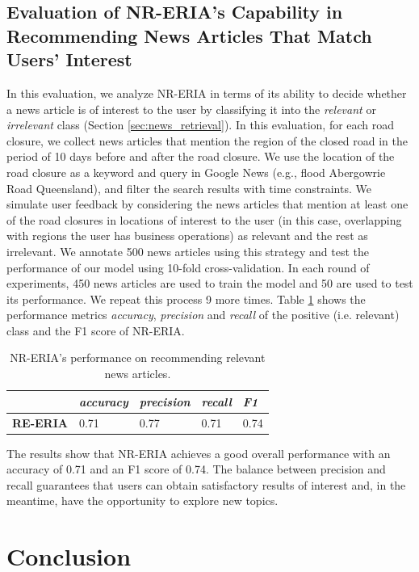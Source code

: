 \documentclass[
]{ceurart}
\begin{document}
\subsection{Evaluation of NR-ERIA's Capability in Recommending News Articles That Match Users' Interest}
In this evaluation, we analyze NR-ERIA in terms of its ability to decide whether a news article is of interest to the user by classifying it into the \textit{relevant} or \textit{irrelevant} class (Section \ref{sec:news_retrieval}). In this evaluation, for each road closure, we collect news articles that mention the region of the closed road in the period of 10 days before and after the road closure. We use the location of the road closure as a keyword and query in Google News (e.g., flood Abergowrie Road Queensland), and filter the search results with time constraints. We simulate user feedback by considering the news articles that mention at least one of the road closures in locations of interest to the user (in this case, overlapping with regions the user has business operations) as relevant and the rest as irrelevant. We annotate 500 news articles using this strategy and test the performance of our model using 10-fold cross-validation. In each round of experiments, 450 news articles are used to train the model and 50 are used to test its performance. We repeat this process 9 more times. Table \ref{tab:RL-ERIA e3} shows the performance metrics \textit{accuracy}, \textit{precision} and \textit{recall} of the positive (i.e. relevant) class and the F1 score of NR-ERIA.


\begin{table}[h]
\caption{NR-ERIA's performance on recommending relevant news articles.}
\label{tab:RL-ERIA e3}
  \centering
  \begin{tabular}{p{2cm}p{1.5cm}p{1.5cm}p{1.5cm}p{1.5cm}}
    \toprule
     & \textit{accuracy} & \textit{precision} & \textit{recall} &\textit{ F1}\\
    \midrule
    \textbf{RE-ERIA} & 0.71 & 0.77 & 0.71 & 0.74\\
    \bottomrule
  \end{tabular}
\end{table}

The results show that NR-ERIA achieves a good overall performance with an accuracy of 0.71 and an F1 score of 0.74. The balance between precision and recall guarantees that users can obtain satisfactory results of interest and, in the meantime, have the opportunity to explore new topics.

\section{Conclusion}\label{5}
\end{document}
